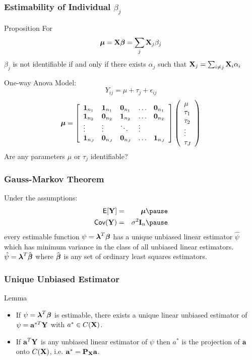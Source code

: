 \documentclass[handout]{beamer}\usepackage[]{graphicx}\usepackage[]{color}
\begin{document}
\begin{frame}
  \frametitle{Estimability of Individual $\beta_j$}
  \begin{block}{Proposition}
For    $$\boldsymbol{\mu} = \mathbf{X} \boldsymbol{\beta} = \sum_j \mathbf{X}_j \beta_j$$
$\beta_j$ is not identifiable  if and only if there exists $\alpha_j$
such that $\mathbf{X}_j = \sum_{i \neq j} \mathbf{X}_i \alpha_i$
  \end{block} \pause
One-way Anova Model:
$$Y_{ij} = \mu + \tau_j + \epsilon_{ij}$$
  $$ \boldsymbol{\mu} =  \left[
    \begin{array}{lllll}
\mathbf{1}_{n_1} & \mathbf{1}_{n_1} & \mathbf{0}_{n_1} &  \ldots & \mathbf{0}_{n_1} \\
\mathbf{1}_{n_2} & \mathbf{0}_{n_2} & \mathbf{1}_{n_2} &  \ldots & \mathbf{0}_{n_2} \\
\vdots & \vdots & \ddots & \vdots \\
\mathbf{1}_{n_J} & \mathbf{0}_{n_J} & \mathbf{0}_{n_J} &  \ldots & \mathbf{1}_{n_J} \\
    \end{array} \right]
 \left(   \begin{array}{l}
      \mu \\
      \tau_1 \\
   \tau_2 \\
 \vdots \\
\tau_J
    \end{array} \right)
$$\pause
Are any parameters $\mu$ or $\tau_j$ identifiable?
\end{frame}
\begin{frame}
  \frametitle{Gauss-Markov Theorem}
  \begin{theorem}

  Under the assumptions:
  \begin{eqnarray*}
    \E[\Y] & = & \mub \pause \\
    \Cov(\Y) & = &\sigma^2 \I_n \pause
  \end{eqnarray*}
every estimable function $\psi = \boldsymbol{\lambda}^T\boldsymbol{\beta}$ has a unique unbiased
linear estimator $\hat{\psi}$ which has minimum variance in the class
of all unbiased linear estimators. \pause  $\hat{\psi} = \boldsymbol{\lambda}^T\hat{\boldsymbol{\beta}}$
where $\hat{\boldsymbol{\beta}}$ is any set of ordinary least squares
estimators.

  \end{theorem}
\end{frame}
\begin{frame}
  \frametitle{Unique Unbiased Estimator}
  \begin{block}{Lemma}
    \begin{itemize}
    \item
    If   $\psi = \boldsymbol{\lambda}^T \boldsymbol{\beta}$ is estimable, there exists a unique
    linear unbiased estimator of $\psi = \mathbf{a}^{*T}\mathbf{Y}$ with $a^* \in
    C(\mathbf{X})$. \pause
\item If $\mathbf{a}^T\mathbf{Y}$ is any unbiased linear estimator of $\psi$
    then $a^*$ is the projection of $\mathbf{a}$ onto $C(\mathbf{X})$, i.e. $\mathbf{a}^* =
    \mathbf{P}_{\mathbf{X}} \mathbf{a}$.
    \end{itemize}

  \end{block}
      \end{frame}
\end{document}

